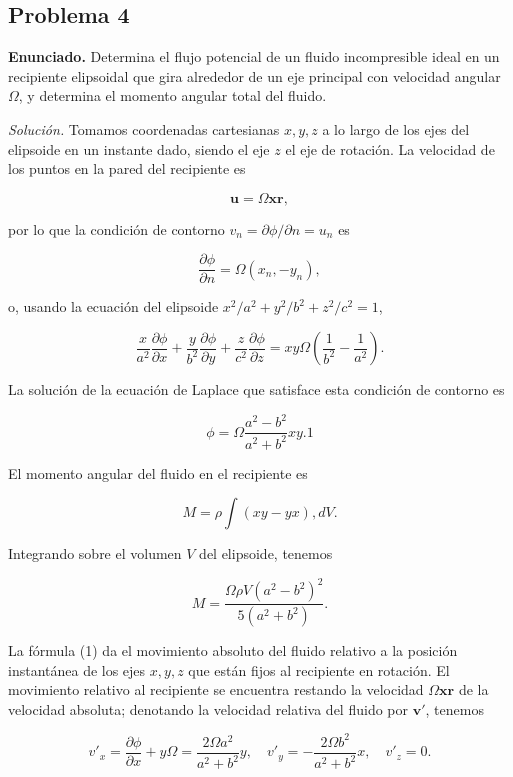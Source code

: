 \documentclass{article}
\begin{document}
\subsection*{Problema 4}

\textbf{Enunciado.} Determina el flujo potencial de un fluido incompresible ideal en un recipiente elipsoidal que gira alrededor de un eje principal con velocidad angular $\Omega$, y determina el momento angular total del fluido.

\textit{Solución.} Tomamos coordenadas cartesianas $x, y, z$ a lo largo de los ejes del elipsoide en un instante dado, siendo el eje $z$ el eje de rotación. La velocidad de los puntos en la pared del recipiente es

$$
\mathbf{u} = \Omega \mathbf{x} \mathbf{r},
$$

por lo que la condición de contorno $v_n = \partial \phi/\partial n = u_n$ es

$$
\frac{\partial \phi}{\partial n} = \Omega (x_n, -y_n),
$$

o, usando la ecuación del elipsoide $x^2/a^2 + y^2/b^2 + z^2/c^2 = 1$,

$$
\frac{x}{a^2} \frac{\partial \phi}{\partial x} + \frac{y}{b^2} \frac{\partial \phi}{\partial y} + \frac{z}{c^2} \frac{\partial \phi}{\partial z} = xy \Omega \left( \frac{1}{b^2} - \frac{1}{a^2} \right).
$$

La solución de la ecuación de Laplace que satisface esta condición de contorno es

$$
\phi = \Omega \frac{a^2 - b^2}{a^2 + b^2} xy. {1}
$$

El momento angular del fluido en el recipiente es

$$
M = \rho \int (xy - yx) , dV.
$$

Integrando sobre el volumen $V$ del elipsoide, tenemos

$$
M = \frac{\Omega \rho V (a^2 - b^2)^2}{5(a^2 + b^2)}.
$$

La fórmula (1) da el movimiento absoluto del fluido relativo a la posición instantánea de los ejes $x, y, z$ que están fijos al recipiente en rotación. El movimiento relativo al recipiente se encuentra restando la velocidad $\Omega \mathbf{x} \mathbf{r}$ de la velocidad absoluta; denotando la velocidad relativa del fluido por $\mathbf{v}'$, tenemos

$$
v'_x = \frac{\partial \phi}{\partial x} + y \Omega = \frac{2 \Omega a^2}{a^2 + b^2} y, \quad v'_y = -\frac{2 \Omega b^2}{a^2 + b^2} x, \quad v'_z = 0.
$$
\end{document}
